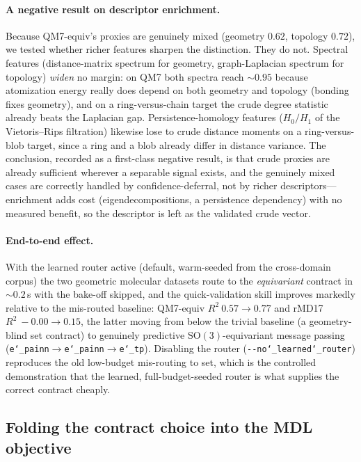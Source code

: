 \documentclass[11pt]{article}
\newcommand{\allowbreakhere}{\discretionary{}{}{}}
\newcommand{\code}[1]{\texttt{\def\_{\char`_\allowbreakhere}#1}}
\begin{document}
\paragraph{A negative result on descriptor enrichment.} Because QM7-equiv's proxies are genuinely mixed
(geometry $0.62$, topology $0.72$), we tested whether richer features sharpen the distinction. They do
not. Spectral features (distance-matrix spectrum for geometry, graph-Laplacian spectrum for topology)
\emph{widen} no margin: on QM7 both spectra reach ${\sim}0.95$ because atomization energy really does
depend on both geometry and topology (bonding fixes geometry), and on a ring-versus-chain target the crude
degree statistic already beats the Laplacian gap. Persistence-homology features ($H_0/H_1$ of the
Vietoris--Rips filtration) likewise lose to crude distance moments on a ring-versus-blob target, since a
ring and a blob already differ in distance variance. The conclusion, recorded as a first-class negative
result, is that crude proxies are already sufficient wherever a separable signal exists, and the genuinely
mixed cases are correctly handled by confidence-deferral, not by richer descriptors---enrichment adds cost
(eigendecompositions, a persistence dependency) with no measured benefit, so the descriptor is left as the
validated crude vector.

\paragraph{End-to-end effect.} With the learned router active (default, warm-seeded from the cross-domain
corpus) the two geometric molecular datasets route to the \emph{equivariant} contract in ${\sim}0.2$\,s
with the bake-off skipped, and the quick-validation skill improves markedly relative to the mis-routed
baseline: QM7-equiv $R^2\ 0.57\to0.77$ and rMD17 $R^2\ -0.00\to0.15$, the latter moving from below the
trivial baseline (a geometry-blind set contract) to genuinely predictive $\mathrm{SO}(3)$-equivariant
message passing (\code{e\_painn}$\to$\code{e\_painn}$\to$\code{e\_tp}). Disabling the router
(\code{-{}-no\_learned\_router}) reproduces the old low-budget mis-routing to set, which is the controlled
demonstration that the learned, full-budget-seeded router is what supplies the correct contract cheaply.

\subsection{Folding the contract choice into the MDL objective}
\label{sec:contract-mdl}
\end{document}
